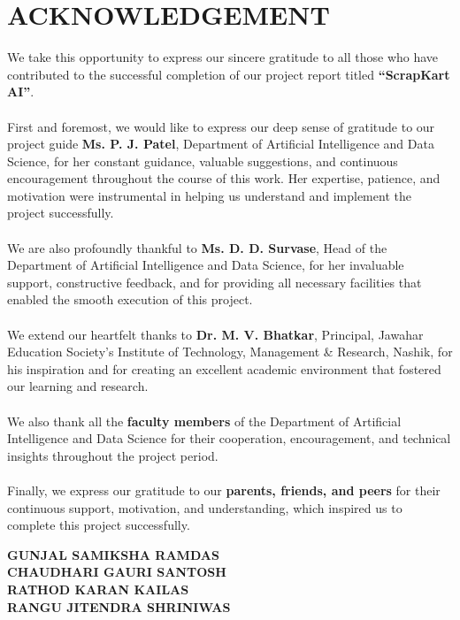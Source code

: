 \chapter*{ACKNOWLEDGEMENT}
\thispagestyle{empty}
    \vspace{0.7cm} 
   
    We take this opportunity to express our sincere gratitude to all those who have contributed to the successful completion of our project report titled \textbf{ “ScrapKart AI”}.\\ \\
First and foremost, we would like to express our deep sense of gratitude to our project guide \textbf{Ms. P. J. Patel}, Department of Artificial Intelligence and Data Science, for her constant guidance, valuable suggestions, and continuous encouragement throughout the course of this work. Her expertise, patience, and motivation were instrumental in helping us understand and implement the project successfully. \\ \\
We are also profoundly thankful to \textbf{ Ms. D. D. Survase}, Head of the Department of \break Artificial Intelligence and Data Science, for her invaluable support, constructive feedback, and for providing all necessary facilities that enabled the smooth execution of this project. \\ \\
We extend our heartfelt thanks to \textbf{ Dr. M. V. Bhatkar}, Principal, Jawahar Education Society’s Institute of Technology, Management \& Research, Nashik, for his inspiration and for creating an excellent academic environment that fostered our learning and \break research. \\ \\
We also thank all the \textbf{ faculty members} of the Department of Artificial Intelligence and Data Science for their cooperation, encouragement, and technical insights throughout the project period. \\ \\
Finally, we express our gratitude to our \textbf{ parents, friends, and peers} for their continuous support, motivation, and understanding, which inspired us to complete this project successfully.

\begin{flushright}
\vspace{1.5cm}
\begin{minipage}{0.5\textwidth}
\begin{flushleft}
\textbf{GUNJAL SAMIKSHA RAMDAS}\\[0.2cm]
\textbf{CHAUDHARI GAURI SANTOSH }\\[0.2cm]
\textbf{RATHOD KARAN KAILAS}\\[0.2cm]
\textbf{RANGU JITENDRA SHRINIWAS}\\[0.2cm]
\end{flushleft}
\end{minipage}
\end{flushright}

